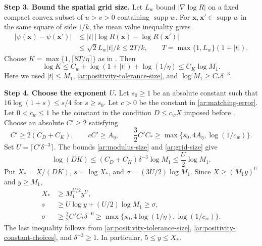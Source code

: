 \documentclass[twoside]{aomart}
\makeatletter
\theoremstyle{paperplain}
\theoremstyle{paperdefinition}
\renewenvironment{proof}[1][\proofname]{\par\pushQED{\qed}%
  \normalfont\topsep6\p@\@plus3\p@\relax\trivlist
  \item[\hskip\labelsep\itshape #1\@addpunct{.}]\ignorespaces
}{\popQED\endtrivlist\@endpefalse}
\numberwithin{equation}{section}
\makeatother
\begin{document}
\begin{proof}
\par
\medskip
\noindent\textbf{Step 3. Bound the spatial grid size.}
Let $L_w$ bound $|\nabla\log R|$ on a fixed compact convex subset
of $u>v>0$ containing $\operatorname{supp}w$.
For $\mathbf x,\mathbf x'\in\operatorname{supp}w$ in the same square
of side $1/k$, the mean value inequality gives
\begin{equation}
 \begin{aligned}
 |\psi(\mathbf x)-\psi(\mathbf x')|
 &\le |t|\,|\log R(\mathbf x)-\log R(\mathbf x')|\\
 &\le\sqrt2L_w|t|/k\le2T/k,
 \qquad T=\max\{1,L_w\}(1+|t|).
 \end{aligned}
 \label{ar:positivity-spatial-oscillation}
\end{equation}
Choose $K=\max\{1,\lceil8T/\eta\rceil\}$ as in .
Then
\begin{equation}
 \log K\le C_w+\log(1+|t|)+\log(1/\eta)
          \le C_K\log M_1.
 \label{ar:grid-size}
\end{equation}
Here we used $|t|\le M_1$, \eqref{ar:positivity-tolerance-size},
and $\log M_1\ge C_*\delta^{-3}$.

\par
\medskip
\noindent\textbf{Step 4. Choose the exponent $U$.}
Let $s_0\ge1$ be an absolute constant such that
$16\log(1+s)\le s/4$ for $s\ge s_0$.
Let $c>0$ be the constant in \eqref{ar:matching-error}.
Let $0<c_w\le1$ be the constant in the condition $D\le c_wX$
imposed before .
Choose an absolute $C'\ge2$ satisfying
\begin{equation}
 C'\ge2(C_D+C_K),\qquad cC'\ge A_\eta,\qquad
 \frac32C'C_*\ge\max\{s_0,4A_\eta,\log(1/c_w)\}.
 \label{ar:positivity-constant-choices}
\end{equation}
Set $U=\lceil C'\delta^{-3}\rceil$.
The bounds \eqref{ar:modulus-size} and \eqref{ar:grid-size} give
\begin{equation*}
 \log(DK)\le(C_D+C_K)\delta^{-3}\log M_1
            \le\frac U2\log M_1.
 \end{equation*}
Put $X_*=X/(DK)$, $s=\log X_*$, and
$\sigma=(3U/2)\log M_1$.
Since $X\ge(M_1y)^U$ and $y\ge M_1$,
\begin{equation}
 \begin{aligned}
 X_*&\ge M_1^{U/2}y^U,\\
 s&\ge U\log y+(U/2)\log M_1\ge\sigma,\\
 \sigma&\ge\frac32C'C_*\delta^{-6}
       \ge\max\{s_0,4\log(1/\eta),\log(1/c_w)\}.
 \end{aligned}
 \label{ar:positivity-effective-size}
\end{equation}
The last inequality follows from
\eqref{ar:positivity-tolerance-size},
\eqref{ar:positivity-constant-choices}, and $\delta^{-3}\ge1$.
In particular, $5\le y\le X_*$.


\end{proof}
\end{document}

